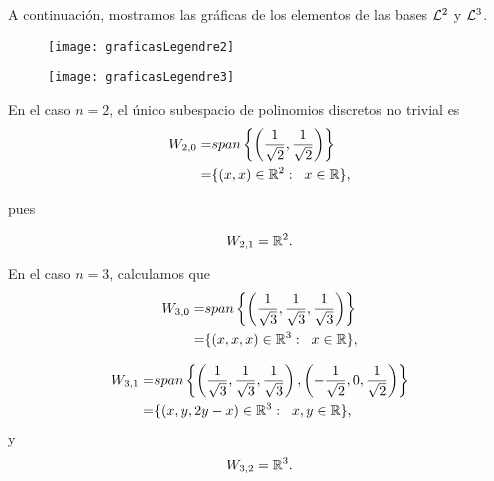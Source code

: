 \begin{comment}
{\Huge{
$\cali{L}^{\textcolor{ameCyanO}{n}, \textcolor{ameVerde}{k}} =
\left(
\cali{L}^{\textcolor{ameCyanO}{n}, \textcolor{ameVerde}{k}}_{
\textcolor{ameGris}{m}}
\right)_{m=0}^{n-1} \in \IR^{n }
$
}}
\end{comment}

\begin{ejemplo}
A continuación, mostramos las gráficas de los
elementos de las bases $\mathcal{L}^{2}$ y $\mathcal{L}^{3}$.

\begin{figure}[H]
	\centering
	\texttt{[image: graficasLegendre2]} 
\end{figure}	


\begin{figure}[H]
	\centering
	\texttt{[image: graficasLegendre3]} 
\end{figure}	 




En el caso $n=2$, el único subespacio de polinomios
discretos no trivial es 
\begin{align*}
W_{2,0}= & span \left\{ 
\left(\frac{1}{\sqrt2}, \frac{1}{\sqrt2} \right) \right\} \\
= & \{ (x,x) \in \mathbb{R}^{2}: \hspace{0.2cm} x \in \mathbb{R} \},
\end{align*}

pues

\begin{equation*}
\label{eq1: 1Dic}
W_{2,1}= \mathbb{R}^{2}.
\end{equation*}


En el caso $n=3$, calculamos que
\begin{align*}
W_{3,0}= & span \left\{
\left( \frac{1}{\sqrt3}, \frac{1}{\sqrt3},
\frac{1}{\sqrt3} \right) \right\}  \\
= & \{ (x,x,x) \in \mathbb{R}^{3}: \hspace{0.2cm} x \in \mathbb{R} \},
\end{align*}

\begin{align}
\label{eq2: 1Dic}
W_{3,1}= & span \left\{ \left( \frac{1}{\sqrt3}, \frac{1}{\sqrt3},
\frac{1}{\sqrt3} \right) ,
\left( -\frac{1}{\sqrt2}, 0,  \frac{1}{\sqrt2} \right) \right\}
\nonumber \\
= & \{ (x,y,2y-x) \in \mathbb{R}^{3}: \hspace{0.2cm} x,y \in \mathbb{R} \},
\end{align}
y
\[
W_{3,2}=\mathbb{R}^{3}.
\]


\end{ejemplo}
